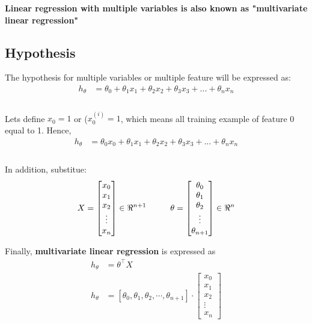 \textbf{Linear regression with multiple variables is also known as "multivariate linear regression"}
\subsection{Hypothesis}
The hypothesis for multiple variables or multiple feature will be expressed as:
\begin{equation*}
\begin{aligned}
h_{\theta} &= \theta_0 + \theta_1 x_1 + \theta_2 x_2 + \theta_3 x_3 + ... + \theta_n x_n \\ \\
\end{aligned}
\end{equation*}

Lets define $x_0 = 1$ or ($x^{(i)}_0 = 1$, which means all training example of feature 0 equal to 1.
Hence, 
\begin{equation}
\begin{aligned}
h_{\theta} &= \theta_0 x_0 + \theta_1 x_1 + \theta_2 x_2 + \theta_3 x_3 + ... + \theta_n x_n \\ \\
\end{aligned}
\end{equation}

In addition, substitue:
\begin{equation}
X = \begin{bmatrix}
			x_{0} \\
			x_{1} \\
			x_{2} \\
			\vdots \\
			x_{n}
		\end{bmatrix} \in \Re{^{n+1}} 	\hspace*{10mm}	
\theta = \begin{bmatrix}
			\theta_{0} \\
			\theta_{1} \\
			\theta_{2} \\
			\vdots \\
			\theta_{n+1} 
\end{bmatrix}	\in \Re{^{n}}
\end{equation}

Finally, \textbf{multivariate linear regression} is expressed as
\begin{equation}
\begin{aligned}
h_{\theta} &= \theta^\intercal X\\
h_{\theta} &= \left[\theta_{0}, \theta_{1}, \theta_{2}, \cdots, \theta_{n+1} \right] \cdot \begin{bmatrix}
				x_{0} \\
				x_{1} \\
				x_{2} \\
				\vdots \\
				x_{n}
				\end{bmatrix}
\end{aligned}
\end{equation}

